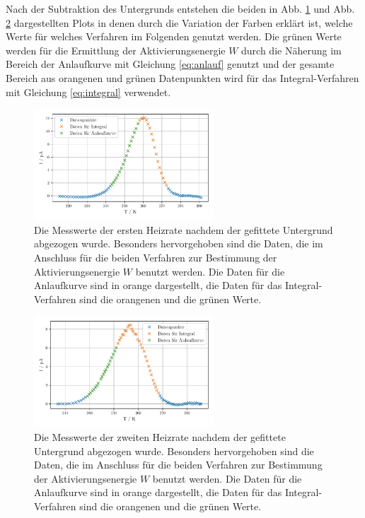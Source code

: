 Nach der Subtraktion des Untergrunds entstehen die beiden in Abb. \ref{abb:wo_bkg1} und Abb. \ref{abb:wo_bkg2} dargestellten Plots in denen durch die Variation der Farben erklärt ist, welche Werte für welches Verfahren im Folgenden genutzt werden. Die grünen Werte werden für die Ermittlung der Aktivierungsenergie $W$ durch die Näherung im Bereich der Anlaufkurve mit Gleichung \eqref{eq:anlauf} genutzt und der gesamte Bereich aus orangenen und grünen Datenpunkten wird für das Integral-Verfahren mit Gleichung \eqref{eq:integral} verwendet. 
\begin{figure}
    \centering
    \includegraphics[width=0.6\textwidth]{figures/data_wo_bkg1.pdf}
    \caption{Die Messwerte der ersten Heizrate nachdem der gefittete Untergrund abgezogen wurde. Besonders hervorgehoben sind die Daten, die im Anschluss für die beiden Verfahren zur Bestimmung der Aktivierungsenergie $W$ benutzt werden. Die Daten für die Anlaufkurve sind in orange dargestellt, die Daten für das Integral-Verfahren sind die orangenen und die grünen Werte.}
    \label{abb:wo_bkg1}
\end{figure}
\begin{figure}
    \centering
    \includegraphics[width=0.6\textwidth]{figures/data_wo_bkg2.pdf}
    \caption{Die Messwerte der zweiten Heizrate nachdem der gefittete Untergrund abgezogen wurde. Besonders hervorgehoben sind die Daten, die im Anschluss für die beiden Verfahren zur Bestimmung der Aktivierungsenergie $W$ benutzt werden. Die Daten für die Anlaufkurve sind in orange dargestellt, die Daten für das Integral-Verfahren sind die orangenen und die grünen Werte.}
    \label{abb:wo_bkg2}
\end{figure}

